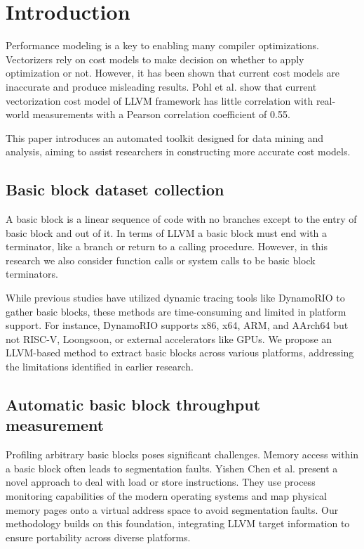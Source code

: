 \section{Introduction}
Performance modeling is a key to enabling many compiler optimizations. Vectorizers rely on cost models to 
make decision on whether to apply optimization or not. However, it has been shown that current cost models
are inaccurate and produce misleading results. Pohl et al. \cite{pohlPortableCostModeling2019} show that
current vectorization cost model of LLVM framework has little correlation with real-world measurements 
with a Pearson correlation coefficient of 0.55.

This paper introduces an automated toolkit designed for data mining and analysis, aiming to assist 
researchers in constructing more accurate cost models.

\subsection{Basic block dataset collection}

A basic block is a linear sequence of code with no branches except to the entry of basic block and out 
of it. In terms of LLVM a basic block must end with a terminator, like a branch or return to a calling 
procedure. However, in this research we also consider function calls or system calls to be basic block 
terminators.

While previous studies have utilized dynamic tracing tools like DynamoRIO \cite{chenBHiveBenchmarkSuite2019} 
to gather basic blocks, these methods are time-consuming and limited in platform support. For instance, 
DynamoRIO supports x86, x64, ARM, and AArch64 \cite{brueningInfrastructureAdaptiveDynamic2003} but not 
RISC-V, Loongsoon, or external accelerators like GPUs. We propose an LLVM-based method to extract basic 
blocks across various platforms, addressing the limitations identified in earlier research.


\subsection{Automatic basic block throughput measurement}

Profiling arbitrary basic blocks poses significant challenges. Memory access within a basic block often 
leads to segmentation faults. Yishen Chen et al. \cite{chenBHiveBenchmarkSuite2019} present a novel 
approach to deal with load or store instructions. They use process monitoring capabilities of the modern 
operating systems and map physical memory pages onto a virtual address space to avoid segmentation faults. 
Our methodology builds on this foundation, integrating LLVM target information to ensure portability 
across diverse platforms.

